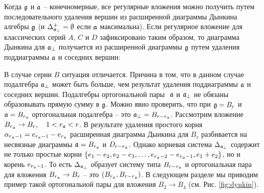 Когда  $\mathfrak{g}$ и $\mathfrak{a}$ -- конечномерные, все регулярные вложения можно получить путем последовательного удаления вершин из расширенной диаграммы Дынкина алгебры $\mathfrak{g}$ (и  $\Delta_{\mathfrak{a}_{\perp} }^{+}=\emptyset $ если $\mathfrak{a}$ максимальна). Если регулярное вложение для классических серий $A$, $C$ и $D$ зафиксировано таким образом, то диаграмма Дынкина для $\mathfrak{a}_{\perp}$ получается из расширенной диаграммы $\mathfrak{g}$ путем удаления поддиаграммы $\mathfrak{a}$ и соседних вершин:
\begin{table}[tbh]
\label{tab:diagrams} \noindent {}
\caption{Подалгебры $\af,\;\afb$ для классических серий}
\end{table}

В случае серии $B$ ситуация отличается. Причина в том, что в данном случае подалгебра $\mathfrak{a}_{\perp}$ может быть больше, чем результат удаления поддиаграммы  $\mathfrak{a}$ и соседних вершин. Подалгебры ортогональной пары $\ \af$ и $\mathfrak{a}_{\perp}$ не обязаны образовывать прямую сумму в $\mathfrak{g}$. Можно явно проверить, что при  $\mathfrak{g}=B_{r}$ и $\mathfrak{a}=B_{r_{\mathfrak{a}}}$ ортогональная подалгебра -- это $\mathfrak{a}_{\perp}=B_{r-r_{\mathfrak{a}}}$. Рассмотрим вложение $B_{r_{\mathfrak{a}}}\rightarrow B_{r},\quad 1<r_{\mathfrak{a}}<r$. В результате удаления простого корня  $\alpha _{r_{\mathfrak{a}}-1}=e_{r_{\mathfrak{a}}-1}-e_{r_{\mathfrak{a}}}$ расширенная диаграмма Дынкина для $B_{r}$ разбивается на несвязные диаграммы $\mathfrak{a}=B_{r_{\mathfrak{a}}}$ и $D_{r-r_{\mathfrak{a}}}$. Однако корневая система  $\Delta _{\mathfrak{a}_{\perp}}$ содержит не только простые корни  $\left\{ e_{1}-e_{2},e_{2}-e_{3},\ldots ,e_{r_{\mathfrak{a}}-2}-e_{r_{\mathfrak{a}}-1},e_{1}+e_{2}\right\} $, но и корень $e_{r_{\mathfrak{a}}-1}$. То есть  $\Delta _{\mathfrak{a}_{\perp}}$ образует систему типа  $B_{r-r_{\mathfrak{a}}}$ и ортогональная пара для вложения $B_{r_{\mathfrak{a}}}\rightarrow B_{r}$ -- это  $\left( B_{r_{\mathfrak{a}}},B_{r-r_{\mathfrak{a}}}\right) $. В следующем разделе мы приводим пример такой ортогональной пары для вложения $B_{2}\rightarrow B_{4}$ (см. Рис. \ref{fig:dynkin}).

